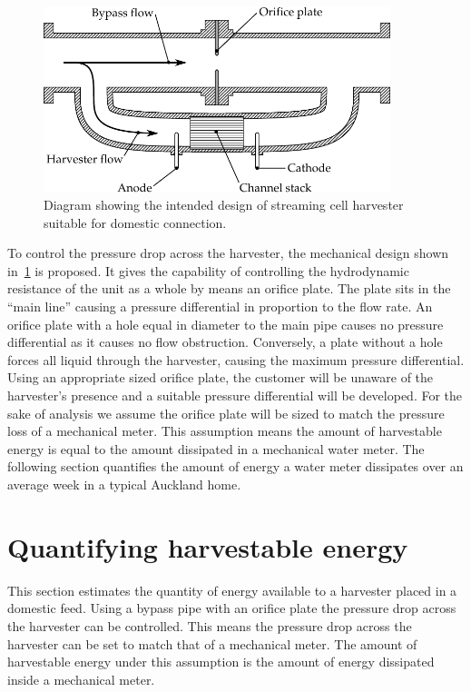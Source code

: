     \begin{figure}
      \centering
      \includegraphics[width=0.9\textwidth]{content/pt1/02-WirelessWaterMeter/graphics/harvester}
      \caption{\label{fig:Diagram_harvester}Diagram showing the intended design of streaming cell harvester suitable for domestic connection.}
    \end{figure}
    To control the pressure drop across the harvester, the mechanical design shown in~\cref{fig:Diagram_harvester} is proposed.
    It gives the capability of controlling the hydrodynamic resistance of the unit as a whole by means an orifice plate.
    The plate sits in the ``main line'' causing a pressure differential in proportion to the flow rate.
    An orifice plate with a hole equal in diameter to the main pipe causes no pressure differential as it causes no flow obstruction.
    Conversely, a plate without a hole forces all liquid through the harvester, causing the maximum pressure differential.
    Using an appropriate sized orifice plate, the customer will be unaware of the harvester's presence and a suitable pressure differential will be developed.
    For the sake of analysis we assume the orifice plate will be sized to match the pressure loss of a mechanical meter.
    This assumption means the amount of harvestable energy is equal to the amount dissipated in a mechanical water meter.
    The following section quantifies the amount of energy a water meter dissipates over an average week in a typical Auckland home.


  \section{Quantifying harvestable energy}

    This section estimates the quantity of energy available to a harvester placed in a domestic feed.
    Using a bypass pipe with an orifice plate the pressure drop across the harvester can be controlled.
    This means the pressure drop across the harvester can be set to match that of a mechanical meter.
    The amount of harvestable energy under this assumption is the amount of energy dissipated inside a mechanical meter.

